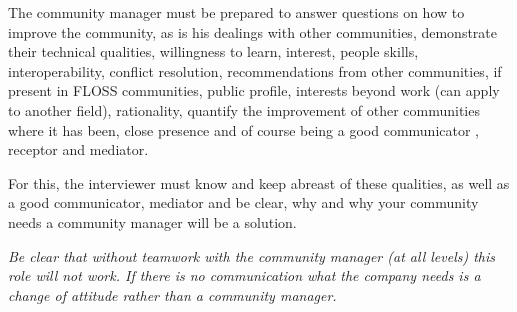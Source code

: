 \documentclass[11pt]{scrartcl}
\begin{document}
\par The community manager must be prepared to answer questions on how to improve the community, as is his dealings with other communities, demonstrate their technical qualities, willingness to learn, interest, people skills, interoperability, conflict resolution, recommendations from other communities, if present in FLOSS communities, public profile, interests beyond work (can apply to another field), rationality, quantify the improvement of other communities where it has been, close presence and of course being a good communicator , receptor and mediator.

\par For this, the interviewer must know and keep abreast of these qualities, as well as a good communicator, mediator and be clear, why and why your community needs a community manager will be a solution.

\par \emph{Be clear that without teamwork with the community manager (at all levels) this role will not work. If there is no communication what the company needs is a change of attitude rather than a community manager.}

\end{document}
